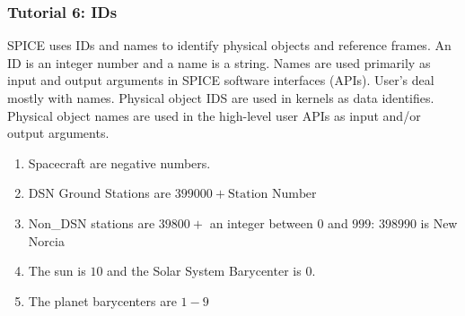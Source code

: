 \documentclass[crop=false,class=book]{standalone}
\begin{document}
\subsubsection{Tutorial 6: IDs}
SPICE uses IDs and names to identify physical objects and reference frames. An ID is an integer number and a name is a string. Names are used primarily as input and output arguments in SPICE software interfaces (APIs). User's deal mostly with names. Physical object IDS are used in kernels as data identifies. Physical object names are used in the high-level user APIs as input and/or output arguments. 
\begin{enumerate}
    \item Spacecraft are negative numbers.
    \begin{itemize}
    \end{itemize}
    \item DSN Ground Stations are $399000+\textrm{Station Number}$
    \begin{itemize}
    \end{itemize}
    \item Non\_DSN stations are $39800+$ an integer between $0$ and $999$: $398990$ is New Norcia
    \item The sun is $10$ and the Solar System Barycenter is $0$.
    \item The planet barycenters are $1-9$
    \begin{itemize}
\end{itemize}
\end{enumerate}
\end{document}
